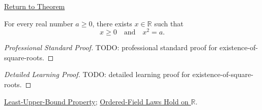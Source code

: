 \newpage
{}
\label{prf:existence-of-square-roots}

\begin{remark*}[Return]
\hyperref[thm:existence-of-square-roots]{Return to Theorem}
\end{remark*}

\begin{theorem*}
For every real number $a\ge 0$, there exists $x\in\mathbb{R}$ such that
\[
x\ge 0
\quad\text{and}\quad
x^2=a.
\]
\end{theorem*}

\begin{proof}[Professional Standard Proof]
\LRAProofBodyStart
TODO: professional standard proof for existence-of-square-roots.
\end{proof}

\begin{proof}[Detailed Learning Proof]
\LRAProofBodyStart
TODO: detailed learning proof for existence-of-square-roots.
\end{proof}

\begin{remark*}
\end{remark*}

\begin{dependencies}
\hyperref[thm:lub-property-r]{Least-Upper-Bound Property};
\hyperref[cor:ordered-field-laws-on-r]{Ordered-Field Laws Hold on $\mathbb{R}$}.
\end{dependencies}

\clearpage
